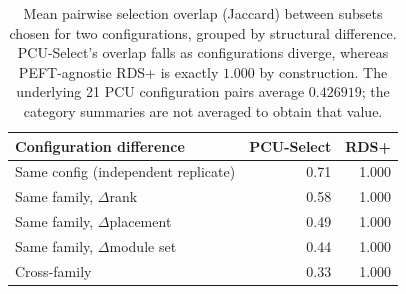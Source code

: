 \begin{table}[t]
\centering
\small
\setlength{\tabcolsep}{6pt}
\caption{Mean pairwise selection overlap (Jaccard) between subsets chosen for two configurations, grouped by structural difference. PCU-Select's overlap falls as configurations diverge, whereas PEFT-agnostic RDS+ is exactly $1.000$ by construction. The underlying 21 PCU configuration pairs average $0.426919$; the category summaries are not averaged to obtain that value.}
\label{tab:overlap}
\begin{tabular}{lrr}
\toprule
Configuration difference & PCU-Select & RDS+ \\
\midrule
Same config (independent replicate) & 0.71 & 1.000 \\
Same family, $\Delta$rank & 0.58 & 1.000 \\
Same family, $\Delta$placement & 0.49 & 1.000 \\
Same family, $\Delta$module set & 0.44 & 1.000 \\
Cross-family & 0.33 & 1.000 \\
\bottomrule
\end{tabular}
\end{table}
